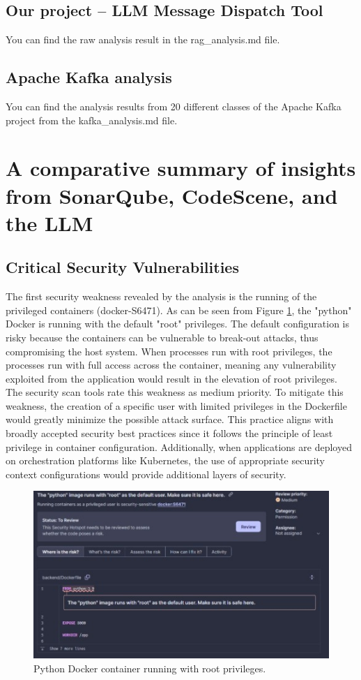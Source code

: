 \documentclass[sigconf]{acmart}
\begin{document}
\subsection{Our project – LLM Message Dispatch Tool}
You can find the raw analysis result in the rag\_analysis.md file.

\subsection{Apache Kafka analysis}
You can find the analysis results from 20 different classes of the Apache Kafka project from the kafka\_analysis.md file.

\section{A comparative summary of insights from SonarQube, CodeScene, and the LLM}
\subsection{Critical Security Vulnerabilities}
The first security weakness revealed by the analysis is the running of the privileged containers (docker-S6471). As can be seen from Figure \ref{fig:figure3}, the "python" Docker is running with the default "root" privileges. The default configuration is risky because the containers can be vulnerable to break-out attacks, thus compromising the host system. When processes run with root privileges, the processes run with full access across the container, meaning any vulnerability exploited from the application would result in the elevation of root privileges. The security scan tools rate this weakness as medium priority. To mitigate this weakness, the creation of a specific user with limited privileges in the Dockerfile would greatly minimize the possible attack surface. This practice aligns with broadly accepted security best practices since it follows the principle of least privilege in container configuration. Additionally, when applications are deployed on orchestration platforms like Kubernetes, the use of appropriate security context configurations would provide additional layers of security.

\begin{figure}[htbp]
    \centering
    \includegraphics[width=1\linewidth]{Image1.jpg}
    \caption{Python Docker container running with root privileges.}
    \label{fig:figure3}
\end{figure}
\end{document}
